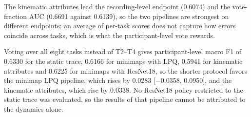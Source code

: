 The kinematic attributes lead the recording-level endpoint (0.6074) and the vote-fraction AUC (0.6691 against 0.6139), so the two pipelines are strongest on different endpoints: an average of per-task scores does not capture how errors coincide across tasks, which is what the participant-level vote rewards.

Voting over all eight tasks instead of T2--T4 gives participant-level macro F1 of 0.6330 for the static trace, 0.6166 for minimaps with LPQ, 0.5941 for kinematic attributes and 0.6225 for minimaps with ResNet18, so the shorter protocol favors the minimap LPQ pipeline, which rises by 0.0283 [$-$0.0358, 0.0950], and the kinematic attributes, which rise by 0.0338. No ResNet18 policy restricted to the static trace was evaluated, so the results of that pipeline cannot be attributed to the dynamics alone.
